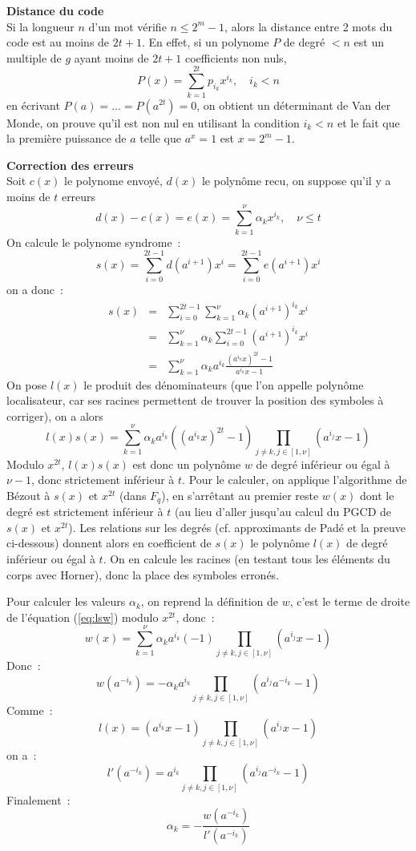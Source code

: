\documentclass[a4paper,11pt]{article}
\begin{document}
\begin{giacjshere}
{\bf Distance du code}\\
Si la longueur $n$ d'un mot v\'erifie
$n \leq 2^m-1$, alors la distance entre 2 mots du code est au moins
de $2t+1$.
En effet, si un polynome $P$ de degr\'e $<n$ est un multiple de $g$
ayant moins de $2t+1$ coefficients non nuls,
\[ P(x)=\sum_{k=1}^{2t} p_{i_k} x^{i_k}, \quad i_k<n \]
en \'ecrivant $P(a)=...=P(a^{2t})=0$, on obtient
un d\'eterminant de Van der Monde, on prouve qu'il est non nul en
utilisant la condition $i_k<n$ et le fait que la premi\`ere puissance
de $a$ telle que $a^x=1$ est $x=2^m-1$.

{\bf Correction des erreurs}\\ 
Soit $c(x)$ le polynome envoy\'e, $d(x)$
le polyn\^ome recu, on suppose qu'il y a moins de $t$ erreurs
\[d(x)-c(x)=e(x)= \sum_{k=1}^\nu \alpha_k x^{i_k}, \quad \nu \leq t\]
On calcule le polynome syndrome~:
\[ s(x)= \sum_{i=0}^{2t-1}d(a^{i+1}) x^i= \sum_{i=0}^{2t-1}e(a^{i+1}) x^i \]
on a donc~:
\begin{eqnarray*} 
s(x) &= &\sum_{i=0}^{2t-1}\sum_{k=1}^\nu \alpha_k (a^{i+1})^{i_k} x^i \\
&=& \sum_{k=1}^\nu \alpha_k \sum_{i=0}^{2t-1}(a^{i+1})^{i_k} x^i\\
&=& \sum_{k=1}^\nu \alpha_k a^{i_k} \frac{(a^{i_k}x)^{2t}-1}{a^{i_k}x-1}
\end{eqnarray*}
On pose $l(x)$ le produit des d\'enominateurs (que l'on appelle polyn\^ome
localisateur, car ses racines permettent de trouver la position
des symboles \`a corriger), on a alors
\begin{equation} \label{eq:lsw}
 l(x) s(x) = \sum_{k=1}^\nu \alpha_k a^{i_k} ( (a^{i_k}x)^{2t} -1 )
\prod_{j\neq k, j \in [1,\nu]} (a^{i_j}x -1) 
\end{equation}
Modulo $x^{2t}$, $l(x)s(x)$ est donc un polyn\^ome $w$ de degr\'e inf\'erieur
ou \'egal \`a $\nu -1$, donc strictement inf\'erieur \`a $t$.
Pour le calculer, on applique l'algorithme de B\'ezout à $s(x)$
et $x^{2t}$ (dans $F_q$), en s'arr\^etant au premier reste $w(x)$
dont le degr\'e est strictement inf\'erieur \`a $t$ (au lieu
d'aller jusqu'au calcul du PGCD de $s(x)$ et $x^{2t}$).
Les relations sur les degr\'es (cf. approximants de Pad\'e et
la preuve ci-dessous) donnent
alors en coefficient de $s(x)$ le polyn\^ome $l(x)$ de degr\'e inf\'erieur ou
\'egal \`a $t$. On en calcule les racines (en testant tous les \'el\'ements
du corps avec Horner), donc la place des symboles erron\'es.

Pour calculer les valeurs $\alpha_k$, on reprend la définition de $w$,
c'est le terme de droite de l'équation (\ref{eq:lsw}) modulo $x^{2t}$,
donc~:
\[ w(x)=\sum_{k=1}^\nu \alpha_k a^{i_k} (-1)
\prod_{j\neq k, j \in [1,\nu]} (a^{i_j}x-1) \]
Donc~:
\[ w(a^{-i_k}) = - \alpha_k a^{i_k}  
\prod_{j\neq k, j \in [1,\nu]} (a^{i_j} a^{-i_k} -1) \]
Comme~:
\[ l(x)=(a^{i_k}x-1)\prod_{j\neq k, j \in [1,\nu]} (a^{i_j}x-1) \]
on a~:
\[ l'(a^{-i_k})=a^{i_k}\prod_{j\neq k, j \in [1,\nu]} (a^{i_j}a^{-i_k}-1) \]
Finalement~:
\[ \alpha_k = -\frac{w(a^{-i_k})}{l'(a^{-i_k})} \]


\end{giacjshere}
\end{document}
